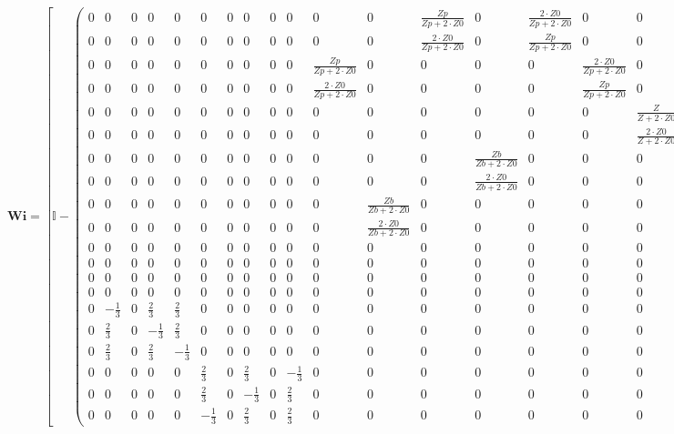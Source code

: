 \[ \mathbf{Wi} =  \left[ \mathbb{I}  -
\left(\begin{array}{cccccccccccccccccccc} 0 & 0 & 0 & 0 & 0 & 0 & 0 &
0 & 0 & 0 & 0 & 0 & \frac{Zp}{Zp+2\cdot Z0} & 0 & \frac{2\cdot
Z0}{Zp+2\cdot Z0} & 0 & 0 & 0 & 0 & 0 \\ 0 & 0 & 0 & 0 & 0 & 0 & 0 & 0
& 0 & 0 & 0 & 0 & \frac{2\cdot Z0}{Zp+2\cdot Z0} & 0 &
\frac{Zp}{Zp+2\cdot Z0} & 0 & 0 & 0 & 0 & 0 \\ 0 & 0 & 0 & 0 & 0 & 0 &
0 & 0 & 0 & 0 & \frac{Zp}{Zp+2\cdot Z0} & 0 & 0 & 0 & 0 & \frac{2\cdot
Z0}{Zp+2\cdot Z0} & 0 & 0 & 0 & 0 \\ 0 & 0 & 0 & 0 & 0 & 0 & 0 & 0 & 0
& 0 & \frac{2\cdot Z0}{Zp+2\cdot Z0} & 0 & 0 & 0 & 0 &
\frac{Zp}{Zp+2\cdot Z0} & 0 & 0 & 0 & 0 \\ 0 & 0 & 0 & 0 & 0 & 0 & 0 &
0 & 0 & 0 & 0 & 0 & 0 & 0 & 0 & 0 & \frac{Z}{Z+2\cdot Z0} & 0 & 0 &
\frac{2\cdot Z0}{Z+2\cdot Z0} \\ 0 & 0 & 0 & 0 & 0 & 0 & 0 & 0 & 0 & 0
& 0 & 0 & 0 & 0 & 0 & 0 & \frac{2\cdot Z0}{Z+2\cdot Z0} & 0 & 0 &
\frac{Z}{Z+2\cdot Z0} \\ 0 & 0 & 0 & 0 & 0 & 0 & 0 & 0 & 0 & 0 & 0 & 0
& 0 & \frac{Zb}{Zb+2\cdot Z0} & 0 & 0 & 0 & 0 & \frac{2\cdot
Z0}{Zb+2\cdot Z0} & 0 \\ 0 & 0 & 0 & 0 & 0 & 0 & 0 & 0 & 0 & 0 & 0 & 0
& 0 & \frac{2\cdot Z0}{Zb+2\cdot Z0} & 0 & 0 & 0 & 0 &
\frac{Zb}{Zb+2\cdot Z0} & 0 \\ 0 & 0 & 0 & 0 & 0 & 0 & 0 & 0 & 0 & 0 &
0 & \frac{Zb}{Zb+2\cdot Z0} & 0 & 0 & 0 & 0 & 0 & \frac{2\cdot
Z0}{Zb+2\cdot Z0} & 0 & 0 \\ 0 & 0 & 0 & 0 & 0 & 0 & 0 & 0 & 0 & 0 & 0
& \frac{2\cdot Z0}{Zb+2\cdot Z0} & 0 & 0 & 0 & 0 & 0 &
\frac{Zb}{Zb+2\cdot Z0} & 0 & 0 \\ 0 & 0 & 0 & 0 & 0 & 0 & 0 & 0 & 0 &
0 & 0 & 0 & 0 & 0 & 0 & 0 & 0 & 0 & 0 & 0 \\ 0 & 0 & 0 & 0 & 0 & 0 & 0
& 0 & 0 & 0 & 0 & 0 & 0 & 0 & 0 & 0 & 0 & 0 & 0 & 0 \\ 0 & 0 & 0 & 0 &
0 & 0 & 0 & 0 & 0 & 0 & 0 & 0 & 0 & 0 & 0 & 0 & 0 & 0 & 0 & 0 \\ 0 & 0
& 0 & 0 & 0 & 0 & 0 & 0 & 0 & 0 & 0 & 0 & 0 & 0 & 0 & 0 & 0 & 0 & 0 &
0 \\ 0 & -\frac{1}{3} & 0 & \frac{2}{3} & \frac{2}{3} & 0 & 0 & 0 & 0
& 0 & 0 & 0 & 0 & 0 & 0 & 0 & 0 & 0 & 0 & 0 \\ 0 & \frac{2}{3} & 0 &
-\frac{1}{3} & \frac{2}{3} & 0 & 0 & 0 & 0 & 0 & 0 & 0 & 0 & 0 & 0 & 0
& 0 & 0 & 0 & 0 \\ 0 & \frac{2}{3} & 0 & \frac{2}{3} & -\frac{1}{3} &
0 & 0 & 0 & 0 & 0 & 0 & 0 & 0 & 0 & 0 & 0 & 0 & 0 & 0 & 0 \\ 0 & 0 & 0
& 0 & 0 & \frac{2}{3} & 0 & \frac{2}{3} & 0 & -\frac{1}{3} & 0 & 0 & 0
& 0 & 0 & 0 & 0 & 0 & 0 & 0 \\ 0 & 0 & 0 & 0 & 0 & \frac{2}{3} & 0 &
-\frac{1}{3} & 0 & \frac{2}{3} & 0 & 0 & 0 & 0 & 0 & 0 & 0 & 0 & 0 & 0
\\ 0 & 0 & 0 & 0 & 0 & -\frac{1}{3} & 0 & \frac{2}{3} & 0 &
\frac{2}{3} & 0 & 0 & 0 & 0 & 0 & 0 & 0 & 0 & 0 & 0 \end{array}\right)
\right]^{-1}  \]

